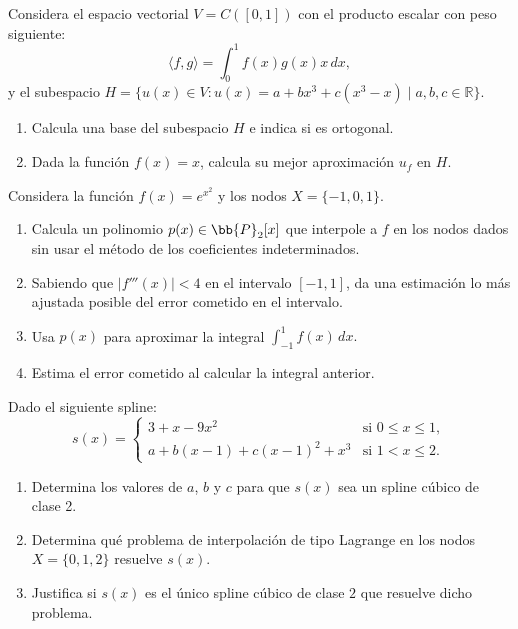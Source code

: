 \documentclass[12pt]{article}
\begin{document}
	\begin{ejercicio}
		Considera el espacio vectorial $V = C([0,1])$ con el producto escalar con peso siguiente:
		$$ \langle f, g \rangle = \int_0^1 f(x) g(x) x \, dx,$$
		y el subespacio $ H = \{ u(x) \in V : u(x) = a + b x^3 + c(x^3 - x) \mid a, b, c \in \mathbb{R} \}.$
		\begin{enumerate}[label=\alph*)]
			\item Calcula una base del subespacio $H$ e indica si es ortogonal.
			
			\item Dada la función $f(x) = x$, calcula su mejor aproximación $u_f$ en $H$.
		\end{enumerate}
	\end{ejercicio}
	
	\begin{ejercicio}
		Considera la función $f(x) = e^{x^2}$ y los nodos $X = \{-1, 0, 1\}$.
		
		\begin{enumerate}[label=\alph*)]
			\item Calcula un polinomio $p(x) \in \bb{P}_2[x]$ que interpole a $f$ en los nodos dados sin usar el método de los coeficientes indeterminados.
			
			\item Sabiendo que $|f'''(x)| < 4$ en el intervalo $[-1, 1]$, da una estimación lo más ajustada posible del error cometido en el intervalo.
			
			\item Usa $p(x)$ para aproximar la integral $\displaystyle \int_{-1}^{1} f(x) \, dx.$
			
			\item Estima el error cometido al calcular la integral anterior.
		\end{enumerate}
	\end{ejercicio}
	
	\begin{ejercicio}
		Dado el siguiente spline:
		$$ s(x)=
		\begin{cases}
			3+x-9x^2 & \text{si } 0 \leq x \leq 1, \\
			a + b(x - 1) + c(x - 1)^2 + x^3 & \text{si } 1 < x \leq 2.
		\end{cases}$$
		
		\begin{enumerate}[label=\alph*)]
			\item Determina los valores de $a$, $b$ y $c$ para que $s(x)$ sea un spline cúbico de clase 2.
			
			\item Determina qué problema de interpolación de tipo Lagrange en los nodos $X = \{0, 1, 2\}$ resuelve $s(x)$.
			
			\item Justifica si $s(x)$ es el único spline cúbico de clase $2$ que resuelve dicho problema.
		\end{enumerate}
	\end{ejercicio}
	
\end{document}
